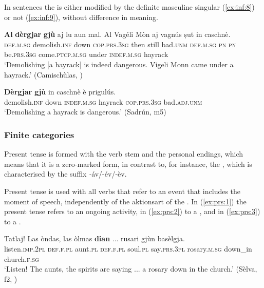 In  sentences the  is either modified by the definite masculine singular  (\ref{ex:inf:8}) or not (\ref{ex:inf:9}), without difference in meaning.
 
\ea
\label{ex:inf:8}
\gll \textbf{Al} \textbf{dèrgjar} \textbf{gjù} aj lu aun mal. Al Vagéli Mòn aj vagnús ṣut in caschnè.\\
\textsc{def.m.sg} demolish.\textsc{inf} down \textsc{cop.prs.3sg} then still bad.\textsc{unm} \textsc{def.m.sg} \textsc{pn} \textsc{pn} be.\textsc{prs.3sg} come.\textsc{ptcp.m.sg} under \textsc{indef.m.sg} hayrack\\
\glt `Demolishing [a hayrack] is indeed dangerous. Vigeli Monn came under a hayrack.' (Camischùlas, )
\z

\ea
\label{ex:inf:9}
\gll \textbf{Dèrgjar} \textbf{gjù} in caschnè è prigulús.\\
demolish.\textsc{inf} down \textsc{indef.m.sg} hayrack \textsc{cop.prs.3sg} bad.\textsc{adj.unm}\\
\glt `Demolishing a hayrack is dangerous.' (Sadrún, m5)
\z

\subsubsection{Finite categories}\label{sec:4.1.2.2}

\label{sec:4.1.2.2.1}
Present tense is formed with the verb stem and the personal endings, which means that it is a zero-marked form, in contrast to, for instance, the , which is characterised by the suffix \textit-{áv/-év/-èv}.

Present tense is used with all verbs that refer to an event that includes the moment of speech, independently of the aktionsart of the . In (\ref{ex:prs:1}) the present tense refers to an ongoing activity, in (\ref{ex:prs:2}) to a , and in (\ref{ex:prs:3}) to a .
                     
\ea\label{ex:prs:1}
\gll Tatlaj! Las òndas, las òlmas \textbf{dian} ... rusari gjùn basèlgja. \\
listen.\textsc{imp.2pl} \textsc{def.f.pl} aunt.\textsc{pl} \textsc{def.f.pl} soul.\textsc{pl} say.\textsc{prs.3pl} {} rosary.\textsc{m.sg} down\_in church.\textsc{f.sg}\\
\glt `Listen! The aunts, the spirits are saying ... a rosary down in the church.' (Sèlva, f2, )
\z

